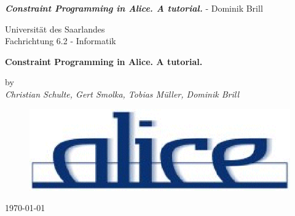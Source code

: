\documentclass[a4paper,halfparskip]{scrartcl}
\begin{document}
\lstset{language = Alice ML }


\begin{htmlonly}
\newcommand{\lstset}[1]{}
\end{htmlonly}



\newcommand{\db}[1]{\textcolor{black}{#1}}

\renewcommand{\labelitemi}{$\bullet$}
\renewcommand{\labelitemii}{$\bullet$}
\renewcommand{\labelitemiii}{$\bullet$}


         {\emph\textbf{Constraint Programming in Alice. A tutorial.} - Dominik
  Brill}

\begin{titlepage}
\begin{latexonly}
Universit\"at des Saarlandes\\
Fachrichtung 6.2 - Informatik
\end{latexonly}
\begin{center}
\begin{latexonly}
\vspace{3cm}
\end{latexonly}
\Huge
\textbf{Constraint Programming in Alice. A tutorial.}\\
\begin{htmlonly}
\vspace{1cm}
\end{htmlonly}
\begin{latexonly}
\vspace{2cm}
\end{latexonly}
\LARGE
by \\
\emph{Christian Schulte, Gert Smolka, Tobias M\"uller, Dominik Brill}
\end{center}
\begin{latexonly}
\vspace{6cm}
\begin{figure}[htpb]
\centerline{
\includegraphics*[scale=0.6]{figs/alice.eps}}
\end{figure}

\vspace{1cm}
\today
\end{latexonly}

\end{titlepage}
\end{document}
